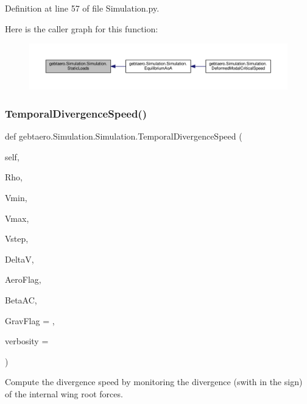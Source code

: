 Definition at line 57 of file Simulation.\+py.

Here is the caller graph for this function\+:
\nopagebreak
\begin{figure}[H]
\begin{center}
\leavevmode
\includegraphics[width=350pt]{classgebtaero_1_1_simulation_1_1_simulation_a36da2334a6e743a9ab29bdfe1334ed04_icgraph}
\end{center}
\end{figure}
\mbox{\label{classgebtaero_1_1_simulation_1_1_simulation_ac3dce2054614b2bbcac1bf97ab9e4ace}} 
\subsubsection{\texorpdfstring{Temporal\+Divergence\+Speed()}{TemporalDivergenceSpeed()}}
{\footnotesize\ttfamily def gebtaero.\+Simulation.\+Simulation.\+Temporal\+Divergence\+Speed (\begin{DoxyParamCaption}\item[{}]{self,  }\item[{}]{Rho,  }\item[{}]{Vmin,  }\item[{}]{Vmax,  }\item[{}]{Vstep,  }\item[{}]{DeltaV,  }\item[{}]{Aero\+Flag,  }\item[{}]{Beta\+AC,  }\item[{}]{Grav\+Flag = {},  }\item[{}]{verbosity = {} }\end{DoxyParamCaption})}



Compute the divergence speed by monitoring the divergence (swith in the sign) of the internal wing root forces. 


